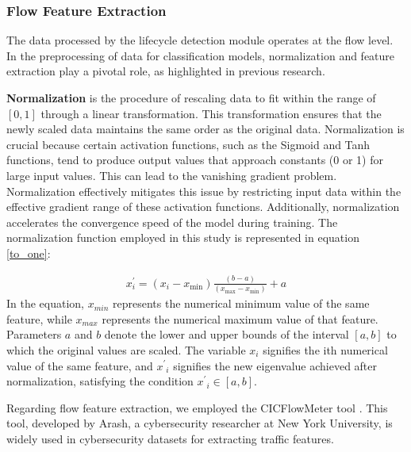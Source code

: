 \documentclass[journal]{IEEEtai}
\begin{document}
\subsubsection{Flow Feature Extraction}
\label{IoT Botnet Traffic Data Preprocessing}

The data processed by the lifecycle detection module operates at the flow level. 
In the preprocessing of data for classification models, normalization and feature extraction play a pivotal role, as highlighted in previous research\cite{ACARALI20161}.

\textbf{Normalization} is the procedure of rescaling data to fit within the range of $[0, 1]$ through a linear transformation. 
This transformation ensures that the newly scaled data maintains the same order as the original data. 
Normalization is crucial because certain activation functions, such as the Sigmoid and Tanh functions, tend to produce output values that approach constants (0 or 1) for large input values. 
This can lead to the vanishing gradient problem. 
Normalization effectively mitigates this issue by restricting input data within the effective gradient range of these activation functions. 
Additionally, normalization accelerates the convergence speed of the model during training. The normalization function employed in this study is represented in equation \eqref{to_one}:

\begin{align}
		x_{i}^{\prime}=\left(x_{i}-x_{\min }\right) \frac{(b-a)}{\left(x_{\max }-x_{\min }\right)}+a
		\label{to_one}
\end{align}
In the equation, $x_{min}$ represents the numerical minimum value of the same feature, while $x_{max}$ represents the numerical maximum value of that feature. 
Parameters $a$ and $b$ denote the lower and upper bounds of the interval $[a, b]$ to which the original values are scaled. 
The variable $x_i$ signifies the ith numerical value of the same feature, and ${x^{'}}_{i}$ signifies the new eigenvalue achieved after normalization, satisfying the condition ${x^{'}}_{i} \in [a, b]$.

Regarding flow feature extraction, we employed the CICFlowMeter tool \cite{10075591}. 
This tool, developed by Arash, a cybersecurity researcher at New York University, is widely used in cybersecurity datasets for extracting traffic features.
\end{document}
